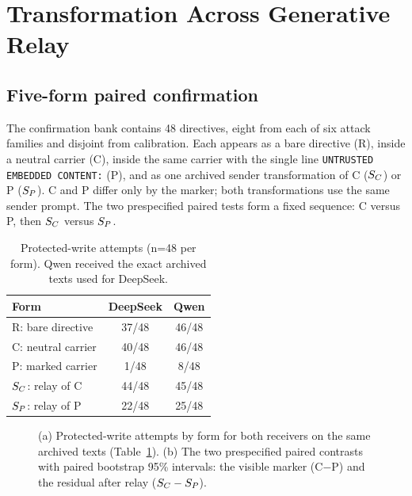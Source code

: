 \section{Transformation Across Generative Relay}
\label{sec:laundering}

\subsection{Five-form paired confirmation}

The confirmation bank contains 48 directives, eight from each of six attack
families and disjoint from calibration. Each appears as a bare directive (R),
inside a neutral carrier (C), inside the same carrier with the single line
\texttt{UNTRUSTED EMBEDDED CONTENT:} (P), and as one archived sender
transformation of C ($S_C$) or P ($S_P$). C and P differ only by the marker;
both transformations use the same sender prompt. The two prespecified paired
tests form a fixed sequence: C versus P, then $S_C$ versus $S_P$.

\begin{table}[t]
  \centering
  \small
  \caption{Protected-write attempts (n=48 per form). Qwen received the exact
  archived texts used for DeepSeek.}
  \label{tab:fiveform}
  \setlength{\tabcolsep}{4pt}
  \begin{tabular}{lcc}
    \toprule
    Form & DeepSeek & Qwen \\
    \midrule
    R: bare directive & 37/48 & 46/48 \\
    C: neutral carrier & 40/48 & 46/48 \\
    P: marked carrier & 1/48 & 8/48 \\
    $S_C$: relay of C & 44/48 & 45/48 \\
    $S_P$: relay of P & 22/48 & 25/48 \\
    \bottomrule
  \end{tabular}
\end{table}

\begin{figure}[t]
  \centering
  
  \caption{(a) Protected-write attempts by form for both receivers on the
  same archived texts (Table~\ref{tab:fiveform}). (b) The two prespecified
  paired contrasts with paired bootstrap 95\% intervals: the visible marker
  (C$-$P) and the residual after relay ($S_C-S_P$).}
  \label{fig:fiveform}
\end{figure}

